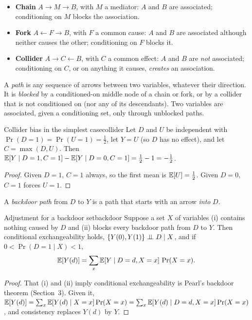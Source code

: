 \documentclass[11pt]{article}
\begin{document}
\begin{itemize}
  \item \textbf{Chain} $A \to M \to B$, with $M$ a mediator: $A$ and $B$ are associated; conditioning on $M$
  blocks the association.
  \item \textbf{Fork} $A \leftarrow F \to B$, with $F$ a common cause: $A$ and $B$ are associated although
  neither causes the other; conditioning on $F$ blocks it.
  \item \textbf{Collider} $A \to C \leftarrow B$, with $C$ a common effect: $A$ and $B$ are \emph{not}
  associated; conditioning on $C$, or on anything it causes, \emph{creates} an association.
\end{itemize}

A \emph{path} is any sequence of arrows between two variables, whatever their direction. It is
\emph{blocked} by a conditioned-on middle node of a chain or fork, or by a collider that is not conditioned
on (nor any of its descendants). Two variables are associated, given a conditioning set, only through
unblocked paths.

\begin{prop}{Collider bias in the simplest case}{collider}
Let $D$ and $U$ be independent with $\Pr(D=1) = \Pr(U=1) = \tfrac12$, let $Y = U$ (so $D$ has no effect),
and let $C = \max(D, U)$. Then $\mathbb{E}[Y \mid D=1, C=1] - \mathbb{E}[Y \mid D=0, C=1] = \tfrac12 - 1 = -\tfrac12$.
\end{prop}
\begin{proof}
Given $D=1$, $C=1$ always, so the first mean is $\mathbb{E}[U] = \tfrac12$. Given $D=0$, $C=1$ forces $U=1$.
\end{proof}

A \emph{backdoor path} from $D$ to $Y$ is a path that starts with an arrow \emph{into} $D$.

\begin{prop}{Adjustment for a backdoor set}{backdoor}
Suppose a set $X$ of variables (i) contains nothing caused by $D$ and (ii) blocks every backdoor path from
$D$ to $Y$. Then conditional exchangeability holds, $\{Y(0), Y(1)\} \perp\!\!\!\perp D \mid X$, and if
$0 < \Pr(D=1 \mid X) < 1$,
\[
  \mathbb{E}[Y(d)] = \sum_x \mathbb{E}[Y \mid D=d, X=x]\,\Pr(X=x) .
\]
\end{prop}
\begin{proof}
That (i) and (ii) imply conditional exchangeability is Pearl's backdoor theorem (Section~3). Given it,
$\mathbb{E}[Y(d)] = \sum_x \mathbb{E}[Y(d) \mid X=x]\Pr(X=x) = \sum_x \mathbb{E}[Y(d) \mid D=d, X=x]\Pr(X=x)$, and consistency
replaces $Y(d)$ by $Y$.
\end{proof}
\end{document}
